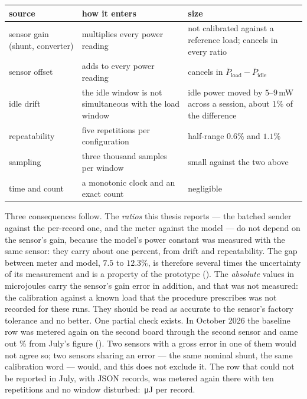 {\small
\noindent\begin{tabularx}{\textwidth}{@{}p{3.4cm} Y >{\raggedright\arraybackslash}p{4.6cm}@{}}
\toprule
source & how it enters & size \\
\midrule
sensor gain (shunt, converter) & multiplies every power reading & not calibrated against a
reference load; cancels in every ratio \\
sensor offset & adds to every power reading & cancels in
$\bar P_{\mathrm{load}} - \bar P_{\mathrm{idle}}$ \\
idle drift & the idle window is not simultaneous with the load window & idle power moved by
$5$--$9$\,mW across a session, about $1\%$ of the difference \\
repeatability & five repetitions per configuration & half-range $0.6\%$ and $1.1\%$ \\
sampling & three thousand samples per window & small against the two above \\
time and count & a monotonic clock and an exact count & negligible \\
\bottomrule
\end{tabularx}
}

\vspace{0.5em}
\noindent Three consequences follow. The \emph{ratios} this thesis reports --- the batched
sender against the per-record one, and the meter against the model --- do not depend on the
sensor's gain, because the model's power constant was measured with the same sensor: they carry
about one percent, from drift and repeatability. The gap between meter and model, $7.5$ to
$12.3\%$, is therefore several times the uncertainty of its measurement and is a property of the
prototype (). The \emph{absolute} values in microjoules carry the sensor's
gain error in addition, and that was not measured: the calibration against a known load that
the procedure prescribes was not recorded for these runs. They should be read as accurate to
the sensor's factory tolerance and no better. One partial check exists. In October 2026 the
baseline row was metered again on the second board through the second sensor and came out
\enCtlVsJuly\% from July's figure (). Two sensors with a gross error in one of
them would not agree so; two sensors sharing an error --- the same nominal shunt, the same
calibration word --- would, and this does not exclude it. The row that could not be reported in
July, with JSON records, was metered again there with ten repetitions and no window disturbed:
\enJsonMeas\,\si{\micro\joule} \enJsonRange{} per record.

